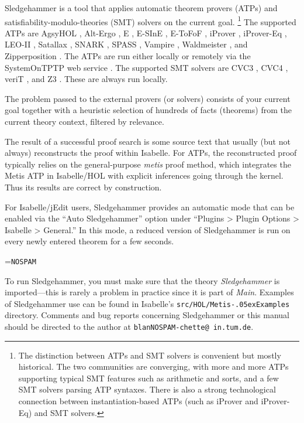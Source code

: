 \documentclass[a4paper,12pt]{article}
\renewcommand\_{\hbox{\textunderscore\kern-.05ex}}
\begin{document}
Sledgehammer is a tool that applies automatic theorem provers (ATPs)
and satisfiability-modulo-theories (SMT) solvers on the current goal.%
\footnote{The distinction between ATPs and SMT solvers is convenient but mostly
historical. The two communities are converging, with more and more ATPs
supporting typical SMT features such as arithmetic and sorts, and a few SMT
solvers parsing ATP syntaxes. There is also a strong technological connection
between instantiation-based ATPs (such as iProver and iProver-Eq) and SMT
solvers.}
%
The supported ATPs are AgsyHOL \cite{agsyHOL}, Alt-Ergo \cite{alt-ergo}, E
\cite{schulz-2002}, E-SInE \cite{sine}, E-ToFoF \cite{tofof}, iProver
\cite{korovin-2009}, iProver-Eq \cite{korovin-sticksel-2010}, LEO-II
\cite{leo2}, Satallax \cite{satallax}, SNARK \cite{snark}, SPASS
\cite{weidenbach-et-al-2009}, Vampire \cite{riazanov-voronkov-2002},
Waldmeister \cite{waldmeister}, and Zipperposition \cite{cruanes-2014}.
The ATPs are run either locally or remotely via the System\-On\-TPTP web service
\cite{sutcliffe-2000}. The supported SMT solvers are CVC3 \cite{cvc3}, CVC4
\cite{cvc4}, veriT \cite{bouton-et-al-2009}, and Z3 \cite{z3}. These are always
run locally.

The problem passed to the external provers (or solvers) consists of your current
goal together with a heuristic selection of hundreds of facts (theorems) from the
current theory context, filtered by relevance.

The result of a successful proof search is some source text that usually (but
not always) reconstructs the proof within Isabelle. For ATPs, the reconstructed
proof typically relies on the general-purpose \textit{metis} proof method, which
integrates the Metis ATP in Isabelle/HOL with explicit inferences going through
the kernel. Thus its results are correct by construction.

For Isabelle/jEdit users, Sledgehammer provides an automatic mode that can be
enabled via the ``Auto Sledgehammer'' option under ``Plugins > Plugin Options >
Isabelle > General.'' In this mode, a reduced version of Sledgehammer is run on
every newly entered theorem for a few seconds.

\newbox\boxA
\setbox\boxA=\hbox{\texttt{NOSPAM}}

\newcommand\authoremail{\texttt{blan{\color{white}NOSPAM}\kern-\wd\boxA{}chette@\allowbreak
in.\allowbreak tum.\allowbreak de}}

To run Sledgehammer, you must make sure that the theory \textit{Sledgehammer} is
imported---this is rarely a problem in practice since it is part of
\textit{Main}. Examples of Sledgehammer use can be found in Isabelle's
\texttt{src/HOL/Metis\_Examples} directory.
Comments and bug reports concerning Sledgehammer or this manual should be
directed to the author at \authoremail.
\end{document}
